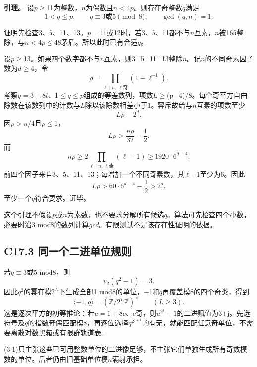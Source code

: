 \textbf{{引理。}} {设\ensuremath{p}\ensuremath{\ge}11为整数，\ensuremath{n}为偶数且\ensuremath{n<4p}。则存在奇整数\ensuremath{q}满足} \[
1<q\le p,\qquad q\equiv3\text{或}5\pmod8,\qquad\gcd(q,n)=1.
\tag{C17.2.1}
\]

{证明先检查3、5、11、13。\ensuremath{p=11}或12时，若3、5、11都不与\ensuremath{n}互素，\ensuremath{n}被165整除，与\ensuremath{n<4p}\ensuremath{\le}48矛盾。所以此时已有合适\ensuremath{q}。}

{设\ensuremath{p}\ensuremath{\ge}13。如果四个数字都不与\ensuremath{n}互素，则3·5·11·13整除\ensuremath{n}。记\ensuremath{n}的不同奇素因子数为\ensuremath{d}\ensuremath{\ge}4，令} \[
\rho=\prod_{\ell\mid n,\ \ell\text{奇}}(1-\ell^{-1}).
\] {考察\ensuremath{q=3+8t}、1\ensuremath{\le}\ensuremath{q}\ensuremath{\le}\ensuremath{p}组成的等差数列，项数\ensuremath{L}\ensuremath{\ge}(p−4)/8。每个奇平方自由除数在该数列中的计数与\ensuremath{L}除以该除数相差小于1。容斥故给与\ensuremath{n}互素的项数至少} \[
L\rho-2^d.
\] {因\ensuremath{p>n/4}且\ensuremath{\rho }\ensuremath{\le}1，} \[
L\rho>\frac{n\rho}{32}-\frac12.
\] {而} \[
n\rho\ge2\prod_{\ell\mid n,\ \ell\text{奇}}(\ell-1)
\ge1920\cdot6^{d-4}.
\] {前四个因子来自3、5、11、13；每增加一个不同奇素数，其\ensuremath{\ell}−1至少为6。因此} \[
L\rho>60\cdot6^{d-4}-\frac12>2^d.
\] {至少一个\ensuremath{q}符合要求。证毕。}

{这个引理不假设\ensuremath{p}或\ensuremath{n}为素数，也不要求分解所有候选\ensuremath{q}。算法可先检查四个小数，必要时沿3} {mod8的数列计算\ensuremath{gcd}。有限测试不是该存在性证明的依据。}

\subsection*{\texorpdfstring{{C17.3} {同一个二进单位规则}}{C17.3 同一个二进单位规则}}\label{C17-h125}

{若\ensuremath{q}\ensuremath{\equiv}3或5} {mod8，则} \[
v_2(q^2-1)=3.
\] {因此\ensuremath{q^{2}}的幂在模\ensuremath{2^L}下生成全部1} {mod8的单位，−1和\ensuremath{q}再覆盖模8的四个奇类，得到} \[
\boxed{\langle-1,q\rangle=(\mathbb Z/2^L\mathbb Z)^\times
\qquad(L\ge3).}
\tag{C17.3.1}
\] {这是逐次平方的初等推论：若\ensuremath{u=1+8c}、\ensuremath{c}奇，则\ensuremath{u^{2^{j}}-1}的二进赋值为3+j。先选符号及\ensuremath{q}的指数奇偶匹配模8，再逐位选择\ensuremath{q^{2^{j+1}}}的有无，就能匹配任意奇单位，不需要离散对数黑箱或有限群轨道表。}

{(3.1)只主张这些已可用整数单位的二进像足够，不主张它们单独生成所有奇数模数的单位。后者仍由旧基础单位模\ensuremath{n}满射承担。}

